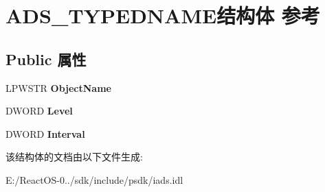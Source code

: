 \hypertarget{struct_a_d_s___t_y_p_e_d_n_a_m_e}{}\section{A\+D\+S\+\_\+\+T\+Y\+P\+E\+D\+N\+A\+M\+E结构体 参考}
\label{struct_a_d_s___t_y_p_e_d_n_a_m_e}
\subsection*{Public 属性}
\begin{DoxyCompactItemize}
\item 
\mbox{\label{struct_a_d_s___t_y_p_e_d_n_a_m_e_ae75e08e3ff3e67f48f00c3be294635e5}} 
L\+P\+W\+S\+TR {\bfseries Object\+Name}
\item 
\mbox{\label{struct_a_d_s___t_y_p_e_d_n_a_m_e_aa634457af8d6df068dd12964daebe9fc}} 
D\+W\+O\+RD {\bfseries Level}
\item 
\mbox{\label{struct_a_d_s___t_y_p_e_d_n_a_m_e_a29d3639945ec1d2ff92f88cb658dd059}} 
D\+W\+O\+RD {\bfseries Interval}
\end{DoxyCompactItemize}


该结构体的文档由以下文件生成\+:\begin{DoxyCompactItemize}
\item 
E\+:/\+React\+O\+S-\/0../sdk/include/psdk/iads.\+idl\end{DoxyCompactItemize}
